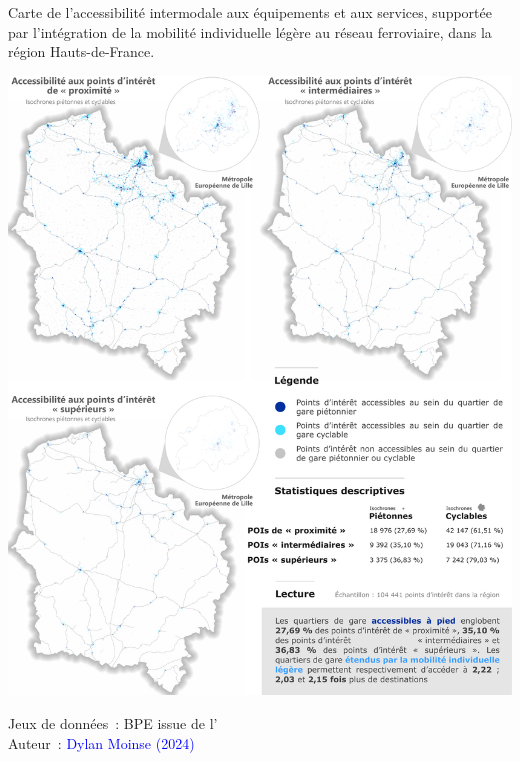 \begin{refsegment}
    \begin{carte}[h!]\vspace*{4pt}
        \caption{Carte de l'accessibilité intermodale aux équipements et aux services, supportée par l'intégration de la mobilité individuelle légère au réseau ferroviaire, dans la région Hauts-de-France.}
        \label{fig-chap5:carte-accessibilite-poi}
        \centerline{\includegraphics[width=1\columnwidth]{src/Figures/Chap-5/FR_Distances_Carte_POI_compressed.pdf}}
        \vspace{5pt}
        \begin{flushright}\scriptsize{
        Jeux de données~: \acrfull{BPE} issue de l'\textcolor{blue}{\textcite{insee_base_2021}}
        \\
        Auteur~: \textcolor{blue}{Dylan Moinse (2024)}
        }\end{flushright}
    \end{carte}


\end{refsegment}
